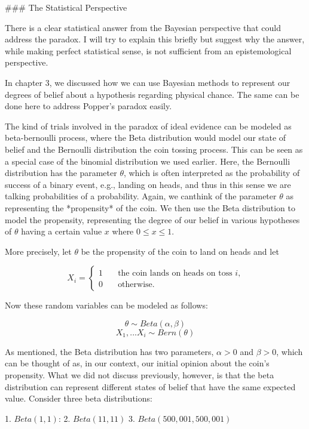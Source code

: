 \#\#\# The Statistical Perspective

There is a clear statistical answer from the Bayesian perspective that
could address the paradox. I will try to explain this briefly but
suggest why the answer, while making perfect statistical sense, is not
sufficient from an epistemological perspective.

In chapter 3, we discussed how we can use Bayesian methods to represent
our degrees of belief about a hypothesis regarding physical chance. The
same can be done here to address Popper's paradox easily.

The kind of trials involved in the paradox of ideal evidence can be
modeled as beta-bernoulli process, where the Beta distribution would
model our state of belief and the Bernoulli distribution the coin
tossing process. This can be seen as a special case of the binomial
distribution we used earlier. Here, the Bernoulli distribution has the
parameter \(\theta\), which is often interpreted as the probability of
success of a binary event, e.g., landing on heads, and thus in this
sense we are talking probabilities of a probability. Again, we canthink
of the parameter \(\theta\) as representing the *propensity* of the
coin. We then use the Beta distribution to model the propensity,
representing the degree of our belief in various hypotheses of
\(\theta\) having a certain value \(x\) where \(0 \leq x \leq 1\).

More precisely, let \(\theta\) be the propensity of the coin to land on
heads and let

\[X_i =
\begin{cases}
   1       & \quad \text{the coin lands on heads on toss $i$,}\\
   0 & \quad \text{otherwise.}
 \end{cases}\]

Now these random variables can be modeled as follows:

\[\theta \sim Beta(\alpha, \beta)\] \[X_1,...X_i \sim Bern(\theta)\]

As mentioned, the Beta distribution has two parameters, \(\alpha>0\) and
\(\beta>0\), which can be thought of as, in our context, our initial
opinion about the coin's propensity. What we did not discuss previously,
however, is that the beta distribution can represent different states of
belief that have the same expected value. Consider three beta
distributions:

1. \(Beta(1,1)\): 2. \(Beta(11,11)\) 3. \(Beta(500,001,500,001)\)

